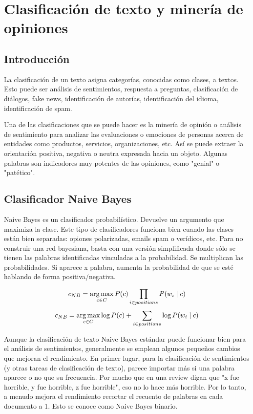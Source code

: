 \chapter{Clasificación de texto y minería de opiniones}
\section{Introducción}
La clasificación de un texto asigna categorías, conocidas como clases, a textos. Esto puede ser análisis de sentimientos, respuesta a preguntas, clasificación de diálogos, fake news, identificación de autorías, identificación del idioma, identificación de spam. 

Una de las clasificaciones que se puede hacer es la minería de opinión o análisis de sentimiento para analizar las evaluaciones o emociones de personas acerca de entidades como productos, servicios, organizaciones, etc. Así se puede extraer la orientación positiva, negativa o neutra expresada hacia un objeto. Algunas palabras son indicadores muy potentes de las opiniones, como "genial" o "patético".  

\section{Clasificador Naive Bayes}
Naive Bayes es un clasificador probabilístico. Devuelve un argumento que maximiza la clase. Este tipo de clasificadores funciona bien cuando las clases están bien separadas: opiones polarizadas, emails spam o verídicos, etc. Para no construir una red bayesiana, basta con una versión simplificada donde sólo se tienen las palabras identificadas vinculadas a la probabilidad. Se multiplican las probabilidades. Si aparece x palabra, aumenta la probabilidad de que se esté hablando de forma positiva/negativa. 

$$c_{NB} = \operatorname*{arg\,max}_{c \in C} P(c) \prod_{i \in positions} P(w_i \mid c)$$
$$c_{NB} = \operatorname*{arg\,max}_{c \in C} \log P(c) + \sum_{i \in positions} \log P(w_i \mid c)$$

Aunque la clasificación de texto Naive Bayes estándar puede funcionar bien para el análisis de sentimientos, generalmente se emplean algunos pequeños cambios que mejoran el rendimiento.
En primer lugar, para la clasificación de sentimientos (y otras tareas de clasificación de texto), parece importar más si una palabra aparece o no que su frecuencia. Por mucho que en una review digan que "x fue horrible, y fue horrible, z fue horrible", eso no lo hace más horrible.  Por lo tanto, a menudo mejora el rendimiento recortar el recuento de palabras en cada documento a 1. Esto se conoce como Naive Bayes binario.


